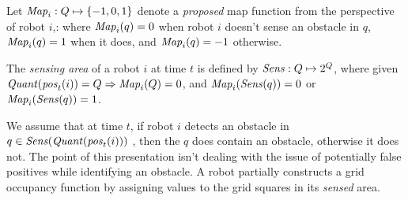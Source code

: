  Let $\mathit{Map}_i:Q\mapsto \left\{-1,0,1\right\}$ denote a \emph{proposed} map function from the perspective of robot $i$,: where $\mathit{Map}_i(q) = 0$ when robot $i$ doesn't sense an obstacle in $q$, $\mathit{Map}_i(q) = 1$ when it does, and $\mathit{Map}_i(q) = -1$ otherwise. 
 \begin{definition} The \emph{sensing area} of a robot $i$ at time $t$ is defined by $\mathit{Sens}: Q \mapsto 2^{Q}$, where given $\mathit{Quant}(\mathit{pos}_t(i)) = Q \Rightarrow \mathit{Map}_i(Q) = 0$, and  $\mathit{Map}_i(\mathit{Sens}(q)) = 0$ or $\mathit{Map}_i(\mathit{Sens}(q)) = 1$. 
  \end{definition}
  
  
We assume that at time $t$, if robot $i$ detects an obstacle in $q \in \mathit{Sens}(\mathit{Quant}(\mathit{pos}_t(i)))$ , then the $q$ does contain an obstacle, otherwise it does not. The point of this presentation isn't dealing with the issue of potentially false positives while identifying an obstacle. A robot partially constructs a grid occupancy function by assigning values to the grid squares in its \emph{sensed} area.

